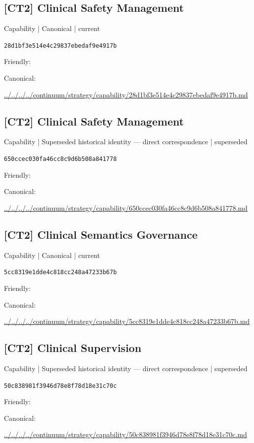 \documentclass[10pt,a4paper]{article}
\begin{document}
\subsection*{[CT2] Clinical Safety Management}
{\small Capability | Canonical | current}\par
\texttt{28d1bf3e514e4c29837ebedaf9e4917b}\par
Friendly: \par
Canonical: \par
{\footnotesize\url{../../../../continuum/strategy/capability/28d1bf3e514e4c29837ebedaf9e4917b.md}}\par
\subsection*{[CT2] Clinical Safety Management}
{\small Capability | Superseded historical identity — direct correspondence | superseded}\par
\texttt{650ccec030fa46cc8c9d6b508a841778}\par
Friendly: \par
Canonical: \par
{\footnotesize\url{../../../../continuum/strategy/capability/650ccec030fa46cc8c9d6b508a841778.md}}\par
\subsection*{[CT2] Clinical Semantics Governance}
{\small Capability | Canonical | current}\par
\texttt{5cc8319e1dde4c818cc248a47233b67b}\par
Friendly: \par
Canonical: \par
{\footnotesize\url{../../../../continuum/strategy/capability/5cc8319e1dde4c818cc248a47233b67b.md}}\par
\subsection*{[CT2] Clinical Supervision}
{\small Capability | Superseded historical identity — direct correspondence | superseded}\par
\texttt{50c838981f3946d78e8f78d18e31c70c}\par
Friendly: \par
Canonical: \par
{\footnotesize\url{../../../../continuum/strategy/capability/50c838981f3946d78e8f78d18e31c70c.md}}\par
\end{document}
